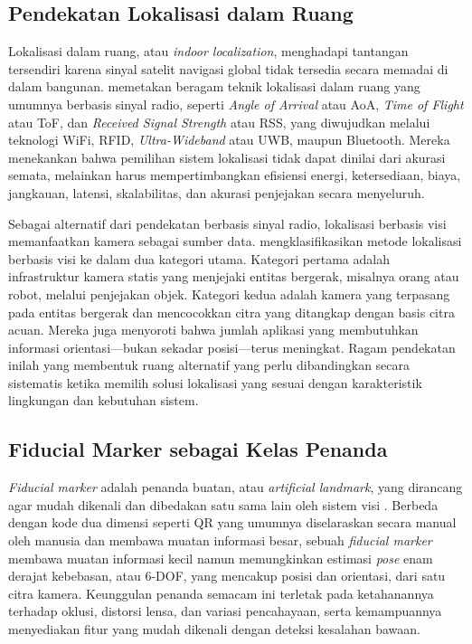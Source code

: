 \subsection{Pendekatan Lokalisasi dalam Ruang}

Lokalisasi dalam ruang, atau \textit{indoor localization}, menghadapi tantangan tersendiri karena sinyal satelit navigasi global tidak tersedia secara memadai di dalam bangunan. \textcite{zafari2019} memetakan beragam teknik lokalisasi dalam ruang yang umumnya berbasis sinyal radio, seperti \textit{Angle of Arrival} atau AoA, \textit{Time of Flight} atau ToF, dan \textit{Received Signal Strength} atau RSS, yang diwujudkan melalui teknologi WiFi, RFID, \textit{Ultra-Wideband} atau UWB, maupun Bluetooth. Mereka menekankan bahwa pemilihan sistem lokalisasi tidak dapat dinilai dari akurasi semata, melainkan harus mempertimbangkan efisiensi energi, ketersediaan, biaya, jangkauan, latensi, skalabilitas, dan akurasi penjejakan secara menyeluruh.

Sebagai alternatif dari pendekatan berbasis sinyal radio, lokalisasi berbasis visi memanfaatkan kamera sebagai sumber data. \textcite{morar2020} mengklasifikasikan metode lokalisasi berbasis visi ke dalam dua kategori utama. Kategori pertama adalah infrastruktur kamera statis yang menjejaki entitas bergerak, misalnya orang atau robot, melalui penjejakan objek. Kategori kedua adalah kamera yang terpasang pada entitas bergerak dan mencocokkan citra yang ditangkap dengan basis citra acuan. Mereka juga menyoroti bahwa jumlah aplikasi yang membutuhkan informasi orientasi---bukan sekadar posisi---terus meningkat. Ragam pendekatan inilah yang membentuk ruang alternatif yang perlu dibandingkan secara sistematis ketika memilih solusi lokalisasi yang sesuai dengan karakteristik lingkungan dan kebutuhan sistem.

\subsection{Fiducial Marker sebagai Kelas Penanda}

\textit{Fiducial marker} adalah penanda buatan, atau \textit{artificial landmark}, yang dirancang agar mudah dikenali dan dibedakan satu sama lain oleh sistem visi \autocite{olson2011}. Berbeda dengan kode dua dimensi seperti QR yang umumnya diselaraskan secara manual oleh manusia dan membawa muatan informasi besar, sebuah \textit{fiducial marker} membawa muatan informasi kecil namun memungkinkan estimasi \textit{pose} enam derajat kebebasan, atau 6-DOF, yang mencakup posisi dan orientasi, dari satu citra kamera. Keunggulan penanda semacam ini terletak pada ketahanannya terhadap oklusi, distorsi lensa, dan variasi pencahayaan, serta kemampuannya menyediakan fitur yang mudah dikenali dengan deteksi kesalahan bawaan.

